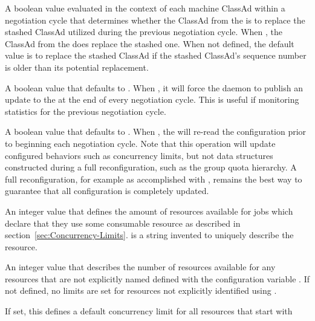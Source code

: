 \begin{description}
\label{param:StartdAdReevalExpr}
\item[\Macro{STARTD\_AD\_REEVAL\_EXPR}]
  A boolean value evaluated in the context of each machine ClassAd within
  a negotiation cycle that determines whether the ClassAd from the
   is to replace the stashed ClassAd utilized during
  the previous negotiation cycle.
  When ,
  the ClassAd from the  does replace the stashed one.
  When not defined, the default value is to replace the stashed ClassAd
  if the stashed ClassAd's sequence number is older than its potential
  replacement.

\label{param:NegotiatorUpdateAfterCycle}
\item[\Macro{NEGOTIATOR\_UPDATE\_AFTER\_CYCLE}]
  A boolean value that defaults to .
  When , it will force the  daemon to publish 
  an update to the  at the end of every negotiation cycle.
  This is useful if monitoring statistics for the previous negotiation cycle. 

\label{param:NegotiatorReadConfigBeforeCycle}
\item[\Macro{NEGOTIATOR\_READ\_CONFIG\_BEFORE\_CYCLE}]
  A boolean value that defaults to .
  When , the  will re-read the configuration
  prior to beginning each negotiation cycle.  
  Note that this operation will update configured behaviors such as 
  concurrency limits, but not data structures
  constructed during a full reconfiguration,
  such as the group quota hierarchy.
  A full reconfiguration, for example as accomplished with ,
  remains the best way to 
  guarantee that all  configuration is completely updated.

\label{param:NameLimit}
\item[\Macro{<NAME>\_LIMIT}]
  An integer value that defines the amount of resources available for
  jobs which declare that they use some consumable resource 
  as described in section~\ref{sec:Concurrency-Limits}. 
   is a string invented to uniquely describe the resource.

\label{param:ConcurrencyLimitDefault}
\item[\Macro{CONCURRENCY\_LIMIT\_DEFAULT}]
  An integer value that describes the number of resources available for
  any resources that are not explicitly named defined with the
  configuration variable .
  If not defined, no limits are set for resources not explicitly identified
  using .

\label{param:ConcurrencyLimitDefaultName}
\item[\Macro{CONCURRENCY\_LIMIT\_DEFAULT\_<NAME>}]
	If set, this defines a default concurrency limit for all resources
that start with 

\end{description}


